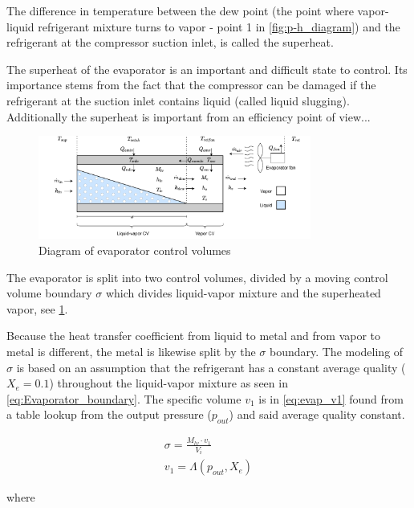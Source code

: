 The difference in temperature between the dew point (the point where vapor-liquid refrigerant mixture turns to vapor - point 1 in \cref{fig:p-h_diagram}) and the refrigerant at the compressor suction inlet, is called the superheat.

The superheat of the evaporator is an important and difficult state to control. Its importance stems from the fact that the compressor can be damaged if the refrigerant at the suction inlet contains liquid (called liquid slugging). Additionally the superheat is important from an efficiency point of view... 

\begin{figure}[h!]
	\centering
	\includegraphics[width=0.8\textwidth]{Graphics/Evaporator_CV_diagram.pdf}
	\caption{Diagram of evaporator control volumes}
	\label{fig:evap_CV}
\end{figure}

The evaporator is split into two control volumes, divided by a moving control volume boundary $\sigma$ which divides liquid-vapor mixture and the superheated vapor, see \cref{fig:evap_CV}.

Because the heat transfer coefficient from liquid to metal and from vapor to metal is different, the metal is likewise split by the $\sigma$ boundary. The modeling of $\sigma$ is based on an assumption that the refrigerant has a constant average quality ($X_e = 0.1$) throughout the liquid-vapor mixture as seen in \cref{eq:Evaporator_boundary}. The specific volume $v_1$ is in \cref{eq:evap_v1} found from a table lookup from the output pressure ($p_{out}$) and said average quality constant.

\begin{align}
	\sigma = \frac{M_{lv} \cdot v_1}{V_i} \label{eq:Evaporator_boundary} \\
	v_1 = \Lambda(p_{out},X_e) \label{eq:evap_v1}
\end{align}

where


